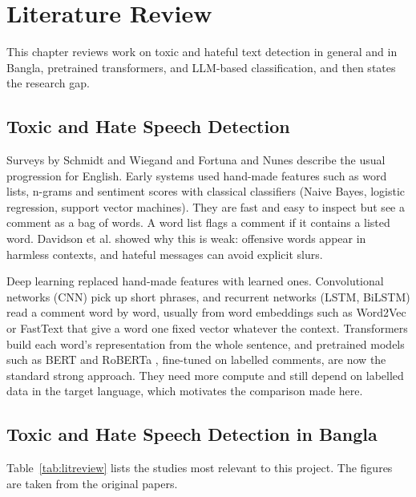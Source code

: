 \chapter{Literature Review}
\justifying

This chapter reviews work on toxic and hateful text detection in general and in Bangla, pretrained transformers, and LLM-based classification, and then states the research gap.

\section{Toxic and Hate Speech Detection}

Surveys by Schmidt and Wiegand \cite{schmidt2017survey} and Fortuna and Nunes \cite{fortuna2018survey} describe the usual progression for English. Early systems used hand-made features such as word lists, n-grams and sentiment scores with classical classifiers (Naive Bayes, logistic regression, support vector machines). They are fast and easy to inspect but see a comment as a bag of words. A word list flags a comment if it contains a listed word. Davidson et al. \cite{davidson2017automated} showed why this is weak: offensive words appear in harmless contexts, and hateful messages can avoid explicit slurs.

Deep learning replaced hand-made features with learned ones. Convolutional networks (CNN) pick up short phrases, and recurrent networks (LSTM, BiLSTM) read a comment word by word, usually from word embeddings such as Word2Vec or FastText that give a word one fixed vector whatever the context. Transformers \cite{vaswani2017attention} build each word's representation from the whole sentence, and pretrained models such as BERT \cite{devlin2019bert} and RoBERTa \cite{liu2019roberta}, fine-tuned on labelled comments, are now the standard strong approach. They need more compute and still depend on labelled data in the target language, which motivates the comparison made here.

\section{Toxic and Hate Speech Detection in Bangla}

Table~\ref{tab:litreview} lists the studies most relevant to this project. The figures are taken from the original papers.

